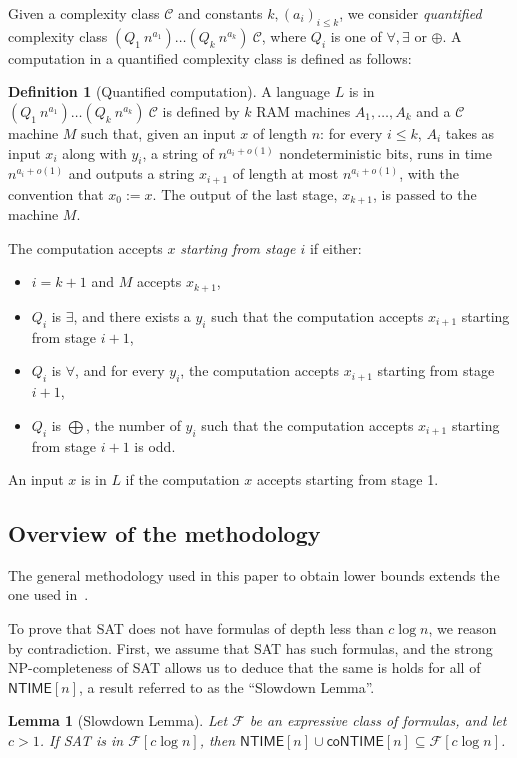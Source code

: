 \documentclass[a4paper, 11pt]{article}
\theoremstyle{plain}
\newtheorem{lemma}[theorem]{Lemma}
\theoremstyle{definition}
\newtheorem{definition}[theorem]{Definition}
\theoremstyle{remark}
\newcommand{\Cc}{\mathcal{C}}%
\newcommand{\Ff}{\mathcal{F}}%
\newcommand{\NP}{\textsf{NP}}%
\newcommand{\NTIME}{\textsf{NTIME}}%
\newcommand{\coNTIME}{\textsf{coNTIME}}%
\newcommand{\SAT}{\textsf{SAT}}%
\begin{document}
Given a complexity class $\Cc$ and constants $k, (a_i)_{i\leq k}$, 
we consider \textit{quantified} complexity
class $(Q_1~n^{a_1})\ldots(Q_k~n^{a_k})~\Cc$, 
where $Q_i$ is one of $\forall, \exists$ or $\oplus$.
A computation in a quantified complexity class is defined as follows:
\begin{definition}[Quantified computation]
	A language $L$ is in $(Q_1~n^{a_1})\ldots(Q_k~n^{a_k})~\Cc$ 
	is defined by $k$ RAM machines $A_1, \ldots, A_k$ and a $\Cc$ machine $M$
	such that, given an input $x$ of length $n$:
	for every $i \le k$, $A_{i}$ takes as input $x_i$ along with $y_i$, 
	a string of $n^{a_{i} + o(1)}$ nondeterministic bits,
	runs in time $n^{a_{i} + o(1)}$ and outputs a string $x_{i+1}$ of length at most $n^{a_{i} + o(1)}$, 
	with the convention that $x_0 := x$.
	The output of the last stage, $x_{k+1}$, is passed to the machine $M$. 

	The computation accepts $x$ \textit{starting from stage $i$} if either:
	\begin{itemize}
		\item $i = k+1$ and $M$ accepts $x_{k+1}$, 
		\item $Q_i$ is $\exists$, and there exists a $y_i$ such that the computation
		accepts $x_{i+1}$ starting from stage $i+1$, 
		\item $Q_i$ is $\forall$, and for every $y_i$, the computation
		accepts $x_{i+1}$ starting from stage $i+1$, 
		\item $Q_i$ is $\bigoplus$, the number of $y_i$ such that the computation
		accepts $x_{i+1}$ starting from stage $i+1$ is odd. 
	\end{itemize}

	An input $x$ is in $L$ if the computation $x$ accepts starting from stage 1.
\end{definition}

\subsection{Overview of the methodology}

The general methodology used in this paper to obtain lower bounds
extends the one used in~\cite{mudigonda2020time}.

To prove that \SAT{} does not have formulas of depth less than $c\log n$, 
we reason by contradiction.
First, we assume that \SAT{} has such formulas, and the strong \NP-completeness of \SAT{}
allows us to deduce that the same is holds for all of $\NTIME[n]$, 
a result referred to as the ``Slowdown Lemma''.
\begin{lemma}[Slowdown Lemma]
	Let $\Ff$ be an expressive class of formulas, and let $c > 1$.
	If \SAT{} is in $\Ff[c \log n]$,
	then $\NTIME[n] \cup \coNTIME[n] \subseteq \Ff[c \log n]$.
\end{lemma}
\end{document}

